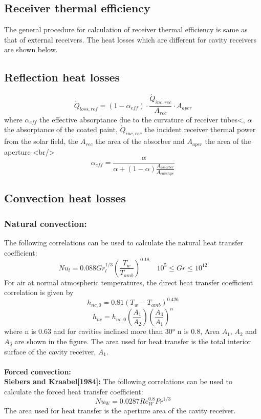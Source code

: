 \subsection{Receiver thermal efficiency}
The general procedure for calculation of receiver thermal efficiency is same as that of external receivers. The heat losses which are different for cavity receivers are shown below.
\subsection{Reflection heat losses}
\begin{equation}
	\dot Q_{loss,ref}=(1-\alpha_{eff})\cdot \frac{\dot Q_{inc,rec}}{A_{rec}} \cdot A_{aper}
\end{equation}
where $\alpha_{eff}$ the effective absorptance due to the curvature of receiver tubes<, $\alpha$ the absorptance of the coated paint, $\dot Q_{inc,rec}$ the incident receiver thermal power from the solar field, the $A_{rec}$ the area of the absorber and $A_{aper}$ the area of the aperture <br/>
\begin{equation}
	\alpha_{eff} = \frac {\alpha} {\alpha+(1-\alpha)\frac{A_{absorber}}{A_{envelope}}}
\end{equation}
\subsection{Convection heat losses}
\subsubsection{Natural convection:}
The following correlations can be used to calculate the natural heat transfer coefficient:
\begin{equation}
Nu_l = 0.088Gr_l^{1/3} \left(\frac{T_w}{T_{amb}}\right)^{0.18} \quad  10^5 \le Gr \le 10^{12}
\end{equation}
For air at normal atmospheric temperatures, the direct heat transfer coefficient correlation is given by 
\begin{equation}
h_{nc,0} = 0.81(T_w - T_{amb})^{0.426}
\end{equation}
\begin{equation}
h_{nc} = h_{nc,0} \left(\frac{A_1}{A_2}\right) \left(\frac{A_3}{A_1}\right)^n
\end{equation}
where n is 0.63 and for cavities inclined more than 30° n is 0.8, Area $A_1$, $A_2$ and $A_3$ are shown in the figure. The area used for heat transfer is the total interior surface of the cavity receiver, $A_1$.\\\\
\textbf{{Forced convection:}}\\[0.2cm]
\textbf{{Siebers and Kraabel[1984]:}} The following correlations can be used to calculate the forced heat transfer coefficient:
\begin{equation}
Nu_W = 0.0287Re_W^{0.8}Pr^{1/3}
\end{equation}
The area used for heat transfer is the aperture area of the cavity receiver.\\\\
